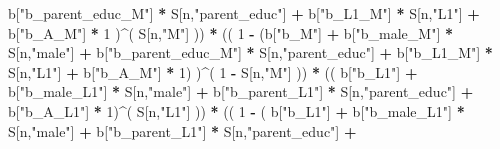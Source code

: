 \documentclass[
]{book}
\newenvironment{Shaded}{\begin{snugshade}}{\end{snugshade}}
\newcommand{\DecValTok}[1]{\textcolor[rgb]{0.00,0.00,0.81}{#1}}
\newcommand{\NormalTok}[1]{#1}
\newcommand{\SpecialCharTok}[1]{\textcolor[rgb]{0.81,0.36,0.00}{\textbf{#1}}}
\newcommand{\StringTok}[1]{\textcolor[rgb]{0.31,0.60,0.02}{#1}}
\begin{document}
\begin{Shaded}
\begin{Highlighting}[]
\NormalTok{                             b[}\StringTok{"b\_parent\_educ\_M"}\NormalTok{] }\SpecialCharTok{*}\NormalTok{ S[n,}\StringTok{"parent\_educ"}\NormalTok{] }\SpecialCharTok{+} 
\NormalTok{                             b[}\StringTok{"b\_L1\_M"}\NormalTok{] }\SpecialCharTok{*}\NormalTok{ S[n,}\StringTok{"L1"}\NormalTok{] }\SpecialCharTok{+}
\NormalTok{                             b[}\StringTok{"b\_A\_M"}\NormalTok{] }\SpecialCharTok{*} \DecValTok{1}\NormalTok{ )}\SpecialCharTok{\^{}}\NormalTok{( S[n,}\StringTok{"M"}\NormalTok{] )) }\SpecialCharTok{*}
\NormalTok{                        (( }\DecValTok{1} \SpecialCharTok{{-}}\NormalTok{ (b[}\StringTok{"b\_M"}\NormalTok{] }\SpecialCharTok{+} 
\NormalTok{                                  b[}\StringTok{"b\_male\_M"}\NormalTok{] }\SpecialCharTok{*}\NormalTok{ S[n,}\StringTok{"male"}\NormalTok{] }\SpecialCharTok{+} 
\NormalTok{                                  b[}\StringTok{"b\_parent\_educ\_M"}\NormalTok{] }\SpecialCharTok{*}\NormalTok{ S[n,}\StringTok{"parent\_educ"}\NormalTok{] }\SpecialCharTok{+} 
\NormalTok{                                  b[}\StringTok{"b\_L1\_M"}\NormalTok{] }\SpecialCharTok{*}\NormalTok{ S[n,}\StringTok{"L1"}\NormalTok{] }\SpecialCharTok{+}
\NormalTok{                                  b[}\StringTok{"b\_A\_M"}\NormalTok{] }\SpecialCharTok{*} \DecValTok{1}\NormalTok{) )}\SpecialCharTok{\^{}}\NormalTok{( }\DecValTok{1} \SpecialCharTok{{-}}\NormalTok{ S[n,}\StringTok{"M"}\NormalTok{] )) }\SpecialCharTok{*}
\NormalTok{                        (( b[}\StringTok{"b\_L1"}\NormalTok{] }\SpecialCharTok{+}
\NormalTok{                             b[}\StringTok{"b\_male\_L1"}\NormalTok{] }\SpecialCharTok{*}\NormalTok{ S[n,}\StringTok{"male"}\NormalTok{] }\SpecialCharTok{+}  
\NormalTok{                             b[}\StringTok{"b\_parent\_L1"}\NormalTok{] }\SpecialCharTok{*}\NormalTok{ S[n,}\StringTok{"parent\_educ"}\NormalTok{] }\SpecialCharTok{+}
\NormalTok{                             b[}\StringTok{"b\_A\_L1"}\NormalTok{] }\SpecialCharTok{*} \DecValTok{1}\NormalTok{)}\SpecialCharTok{\^{}}\NormalTok{( S[n,}\StringTok{"L1"}\NormalTok{] )) }\SpecialCharTok{*}
\NormalTok{                        (( }\DecValTok{1} \SpecialCharTok{{-}}\NormalTok{ ( b[}\StringTok{"b\_L1"}\NormalTok{] }\SpecialCharTok{+}
\NormalTok{                                   b[}\StringTok{"b\_male\_L1"}\NormalTok{] }\SpecialCharTok{*}\NormalTok{ S[n,}\StringTok{"male"}\NormalTok{] }\SpecialCharTok{+}  
\NormalTok{                                   b[}\StringTok{"b\_parent\_L1"}\NormalTok{] }\SpecialCharTok{*}\NormalTok{ S[n,}\StringTok{"parent\_educ"}\NormalTok{] }\SpecialCharTok{+}

\end{Highlighting}
\end{Shaded}
\end{document}
